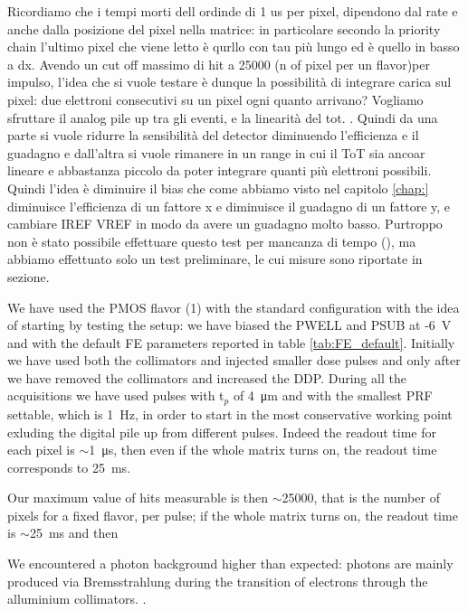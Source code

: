    Ricordiamo che i tempi morti dell ordinde di 1 us per pixel, dipendono dal rate e anche dalla posizione del pixel nella matrice: in particolare secondo la priority chain l'ultimo pixel che viene letto è qurllo con tau più lungo ed è quello in basso a dx. 
   Avendo un cut off massimo di hit a 25000 (n of pixel per un flavor)per impulso, l'idea che si vuole testare è dunque la possibilità di integrare carica sul pixel: due elettroni consecutivi su un pixel ogni quanto arrivano?
   Vogliamo sfruttare il analog pile up tra gli eventi, e la linearità del tot. 
   .
   Quindi da una parte si vuole ridurre la sensibilità del detector diminuendo l'efficienza e il guadagno e dall'altra si vuole rimanere in un range in cui il ToT sia ancoar lineare e abbastanza piccolo da poter integrare quanti più elettroni possibili. Quindi l'idea è diminuire  il bias che come abbiamo visto nel capitolo \ref{chap:} diminuisce l'efficienza di un fattore x e diminuisce il guadagno di un fattore y, e cambiare IREF VREF in modo da avere un guadagno molto basso. 
   Purtroppo non è stato possibile effettuare questo test per mancanza di tempo (), ma abbiamo effettuato solo un test preliminare, le cui misure sono riportate in sezione.


   We have used the PMOS flavor (1) with the standard configuration with the idea of starting by testing the setup: we have biased the PWELL and PSUB at -\SI{6}{V} and with the default FE parameters reported in table \ref{tab:FE_default}.
   Initially we have used both the collimators and injected smaller dose pulses and only after we have removed the collimators and increased the DDP. 
   During all the acquisitions we have used pulses with t$_p$ of \SI{4}{\um} and with the smallest PRF settable, which is \SI{1}{Hz}, in order to start in the most conservative working point exluding the digital pile up from different pulses. Indeed the readout time for each pixel is $\sim$\SI{1}{\us}, then even if the whole matrix turns on, the readout time corresponds to \SI{25}{ms}. 

   Our maximum value of hits measurable is then $\sim$25000, that is the number of pixels for a fixed flavor, per pulse; if the whole matrix turns on, the readout time is $\sim$\SI{25}{ms} and then  

   We encountered a photon background higher than expected: photons are mainly produced via Bremsstrahlung during the transition of electrons through the alluminium collimators.
   .

